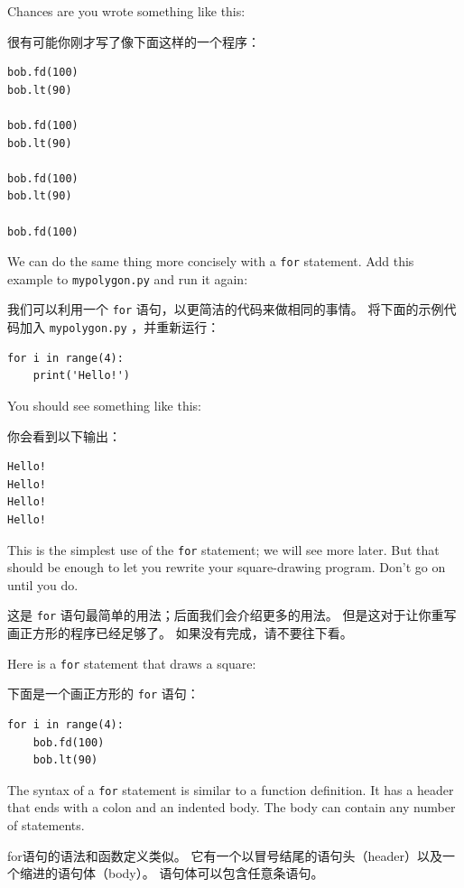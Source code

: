 Chances are you wrote something like this:

很有可能你刚才写了像下面这样的一个程序：

\begin{lstlisting}
bob.fd(100)
bob.lt(90)

bob.fd(100)
bob.lt(90)

bob.fd(100)
bob.lt(90)

bob.fd(100)
\end{lstlisting}

%
We can do the same thing more concisely with a {\tt for} statement.
Add this example to {\tt mypolygon.py} and run it again:

我们可以利用一个 \lstinline{for} 语句，以更简洁的代码来做相同的事情。
将下面的示例代码加入 \lstinline{mypolygon.py} ，并重新运行：
    

\begin{lstlisting}
for i in range(4):
    print('Hello!')
\end{lstlisting}

%
You should see something like this:

你会看到以下输出：

\begin{lstlisting}
Hello!
Hello!
Hello!
Hello!
\end{lstlisting}

%
This is the simplest use of the {\tt for} statement; we will see
more later.  But that should be enough to let you rewrite your
square-drawing program.  Don't go on until you do.

这是 \lstinline{for} 语句最简单的用法；后面我们会介绍更多的用法。
但是这对于让你重写画正方形的程序已经足够了。 如果没有完成，请不要往下看。

Here is a {\tt for} statement that draws a square:

下面是一个画正方形的 \lstinline{for} 语句：

\begin{lstlisting}
for i in range(4):
    bob.fd(100)
    bob.lt(90)
\end{lstlisting}

%
The syntax of a {\tt for} statement is similar to a function
definition.  It has a header that ends with a colon and an indented
body.  The body can contain any number of statements.

for语句的语法和函数定义类似。
它有一个以冒号结尾的语句头（header）以及一个缩进的语句体（body）。
语句体可以包含任意条语句。


